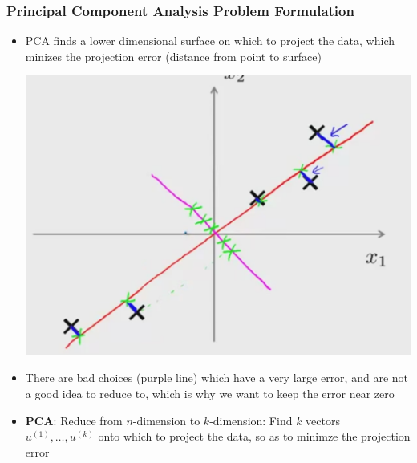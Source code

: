 \subsubsection{Principal Component Analysis Problem Formulation}
\begin{itemize}[--]
	\item PCA finds a lower dimensional surface on which to project the data, which minizes the projection error (distance from point to surface)
	\begin{center}
		\includegraphics[scale=0.5]{sections/cs229/w11/bad.png}
	\end{center}

	\item There are bad choices (purple line) which have a very large error, and are not a good idea to reduce to, which is why we want to keep the error near zero
	\item \textbf{PCA}: Reduce from $n$-dimension to $k$-dimension: Find $k$ vectors $u^{(1)},\ldots,u^{(k)}$ onto which to project the data, so as to minimze the projection error
\end{itemize}

